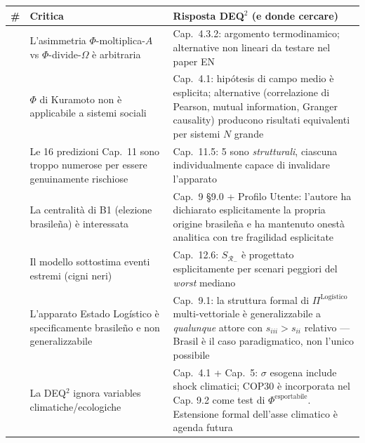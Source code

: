 {\def\LTcaptype{none} %
{\small\begin{longtable}[]{@{}
  >{\raggedright\arraybackslash}p{}
  >{\raggedright\arraybackslash}p{}
  >{\raggedright\arraybackslash}p{}@{}}
\toprule\noalign{}
\begin{minipage}[b]{\linewidth}\raggedright
\#
\end{minipage} & \begin{minipage}[b]{\linewidth}\raggedright
Critica
\end{minipage} & \begin{minipage}[b]{\linewidth}\raggedright
Risposta DEQ$^2$ (e donde cercare)
\end{minipage} \\
\midrule\noalign{}
\endhead
\bottomrule\noalign{}
\endlastfoot
1 & L'asimmetria \(\Phi\)-moltiplica-\(A\) vs \(\Phi\)-divide-\(\Omega\)
è arbitraria & Cap.~4.3.2: argomento termodinamico; alternative non
lineari da testare nel paper EN \\
2 & \(\Phi\) di Kuramoto non è applicabile a sistemi sociali & Cap.~4.1:
hipótesis di campo medio è esplicita; alternative (correlazione di
Pearson, mutual information, Granger causality) producono risultati
equivalenti per sistemi \(N\) grande \\
3 & Le 16 predizioni Cap.~11 sono troppo numerose per essere
genuinamente rischiose & Cap.~11.5: 5 sono \emph{strutturali}, ciascuna
individualmente capace di invalidare l'apparato \\
4 & La centralità di B1 (elezione brasileña) è interessata & Cap.~9
\S{}9.0 + Profilo Utente: l'autore ha dichiarato esplicitamente la propria
origine brasileña e ha mantenuto onestà analitica con tre fragilidad
esplicitate \\
5 & Il modello sottostima eventi estremi (cigni neri) & Cap.~12.6:
\(S_{\mathcal{R}_-}\) è progettato esplicitamente per scenari peggiori
del \emph{worst} mediano \\
6 & L'apparato Estado Logístico è specificamente brasileño e non
generalizzabile & Cap.~9.1: la struttura formal di
\(\Pi^{\text{Logístico}}\) multi-vettoriale è generalizzabile a
\emph{qualunque} attore con \(s_{iii} > s_{ii}\) relativo --- Brasil è
il caso paradigmatico, non l'unico possibile \\
7 & La DEQ$^2$ ignora variables climatiche/ecologiche & Cap.~4.1 + Cap.~5:
\(\sigma\) esogena include shock climatici; COP30 è incorporata nel Cap.
9.2 come test di \(\Phi^{\text{esportabile}}\). Estensione formal
dell'asse climatico è agenda futura \\
\end{longtable}}
}

